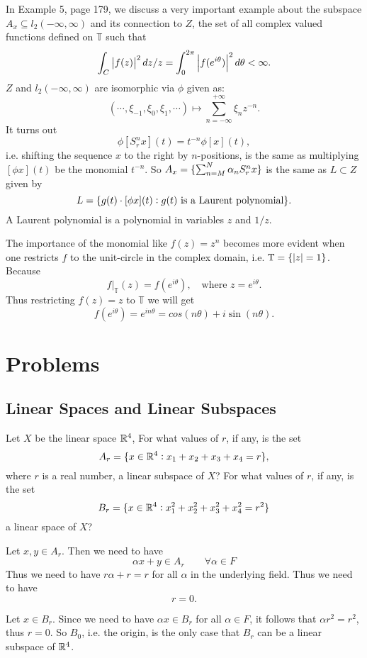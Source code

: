  
 \begin{summary}
 	In Example 5, page 179, we discuss a very important example about the subspace $ A_x \subseteq l_2(-\infty,\infty) $ and its connection to $ Z $, the set of all complex valued functions defined on $ \mathbb{T} $ such that 
 	\[ \int_C \left|f(z)\right|^2 dz/z = \int_{0}^{2\pi} \left|f(e^{i\theta})\right|^2d\theta < \infty. \]
 	$ Z $ and $ l_2(-\infty,\infty) $ are isomorphic via $ \phi $ given as:
 	\[ (\cdots,\xi_{-1}, \xi_{0},\xi_{1},\cdots) \mapsto \sum_{n=-\infty}^{+\infty} \xi_n z^{-n}. \]
 	It turns out
 	\[ \phi[S_r^n x](t) = t^{-n} \phi[x](t), \]
 	i.e. shifting the sequence $ x $ to the right by $ n $-positions, is the same as multiplying $ [\phi x](t) $ be the monomial $ t^{-n} $. So $ A_x = \{\sum_{n=M}^{N}\alpha_n S_r^n x\} $ is the same as $ L\subset Z $ given by
 	\[ L = \{g(t)\cdot [\phi x](t): g(t)\text{ is a Laurent polynomial}\}. \]
 	A Laurent polynomial is a polynomial in variables $ z $ and $ 1/z $.
 	
 	\begin{remark}
 		 The importance of the monomial like $ f(z) = z^n $ becomes more evident when one restricts $ f $ to the unit-circle in the complex domain, i.e. $ \mathbb{T} = \{\left|z\right|=1\} $. Because
 		 \[ f\big|_{\mathbb{T}}(z) = f(e^{i\theta}), \quad \text{where }z=e^{i\theta}. \]
 		 Thus restricting $ f(z)=z $ to $ \mathbb{T} $ we will get
 		 \[ f(e^{i\theta}) = e^{in\theta} = cos(n\theta) + i\sin(n\theta). \]
 	\end{remark}

 \end{summary}


\section{Problems}

\subsection{Linear Spaces and Linear Subspaces}
\begin{problem}
	Let $ X $ be the linear space $ \mathbb{R}^4 $, For what values of $ r $, if any, is the set
	\[ A_r = \{x\in\mathbb{R}^4: x_1+x_2+x_3+x_4 = r\}, \]
	where $ r $ is a real number, a linear subspace of $ X $? For what values of $ r $, if any,
	is the set
	\[ B_r = \{x\in \mathbb{R}^4: x_1^2 + x_2^2 + x_3^2+x_4^2 = r^2\} \]
	a linear space of $ X $?
\end{problem}

\begin{solution}
	Let $ x,y \in A_r $. Then we need to have
	\[ \alpha x + y \in A_r \qquad \forall\alpha\in F \]
	Thus we need to have $ r\alpha + r = r $ for all $ \alpha $ in the underlying field. Thus we need to have
	\[ r = 0. \]
	
	Let $ x \in B_r $. Since we need to have $ \alpha x \in B_r $ for all $ \alpha\in F $, it follows that $ \alpha r^2 = r^2 $, thus $ r=0 $. So $ B_0 $, i.e. the origin, is the only case that $ B_r $ can be a linear subspace of $ \mathbb{R}^4 $.
\end{solution}


